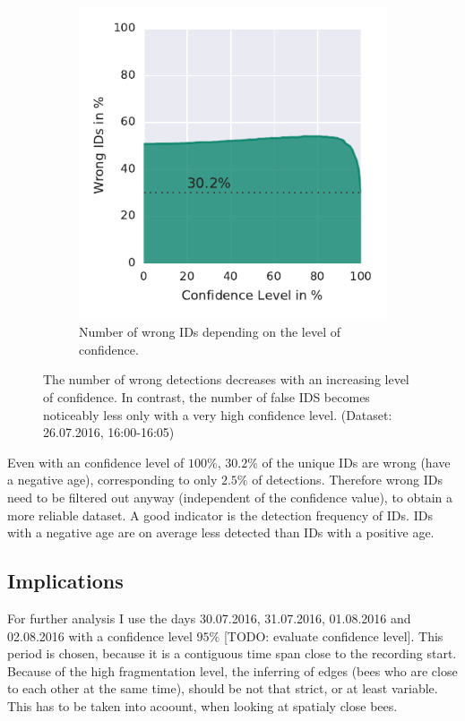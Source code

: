 \begin{figure}
\begin{subfigure}[b]{0.45\textwidth}
        \includegraphics[width=\textwidth]{Figures/confVSidsquality}
        \caption[Unique IDs]{Number of wrong IDs depending on the level of confidence.}
        \label{fig:confVSidsquality}
    \end{subfigure}
    \caption[Data Quality]{The number of wrong detections decreases with an increasing level of confidence. In contrast, the number of false IDS becomes noticeably less only with a very high confidence level. (Dataset: 26.07.2016, 16:00-16:05)}
    \label{fig:quality}
\end{figure}

Even with an confidence level of $100\%$, $30.2\%$ of the unique IDs are wrong (have a negative age), corresponding to only $2.5\%$ of detections. Therefore wrong IDs need to be filtered out anyway (independent of the confidence value), to obtain a more reliable dataset. A good indicator is the detection frequency of IDs. IDs with a negative age are on average less detected than IDs with a positive age.


\subsection{Implications}
For further analysis I use the days 30.07.2016, 31.07.2016, 01.08.2016 and 02.08.2016 with a confidence level $95\%$ [TODO: evaluate confidence level]. This period is chosen, because it is a contiguous time span close to the recording start.
Because of the high fragmentation level, the inferring of edges (bees who are close to each other at the same time), should be not that strict, or at least variable. This has to be taken into acoount, when looking at spatialy close bees.


